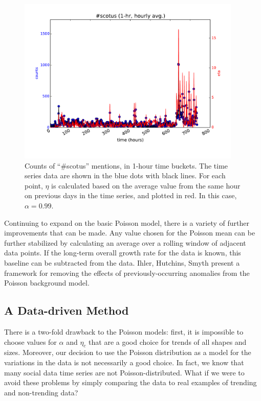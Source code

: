 \documentclass{article}
\begin{document}
\begin{figure}
\begin{center}
\includegraphics[width=0.95\textwidth]{fig/scotus_1month_ccpm.pdf}
\caption{Counts of ``\#scotus'' mentions, in 1-hour time buckets. The time series
data are shown in the blue dots with black lines. For each point, $\eta$ is
calculated based on the average value from the same hour on previous days
in the time series, and plotted in red. In this case, $\alpha=0.99$. }
\label{fig:scotus4}
\end{center}
\end{figure}

Continuing to expand on the basic Poisson model, there is a variety of
further improvements that can be made. Any value chosen for the Poisson
mean can be further stabilized by calculating an average over a rolling
window of adjacent data points. If the long-term overall growth rate for
the data is known, this baseline can be subtracted from the
data. Ihler, Hutchins, Smyth \cite{Ihler:2006} present a
framework for removing the effects of previously-occurring anomalies from
the Poisson background model. 



\subsection{A Data-driven Method} 
\label{nikolov}

There is a two-fold drawback to the Poisson models: first, it is impossible to
choose values for $\alpha$ and $\eta_c$ that are a good choice for trends of all shapes
and sizes. Moreover, our decision to use the Poisson distribution as a model
for the variations in the data is not necessarily a good choice. In fact, we
know that many social data time series are not Poisson-distributed. What if we
were to avoid these problems by simply comparing the data to real examples of
trending and non-trending data?
\end{document}
